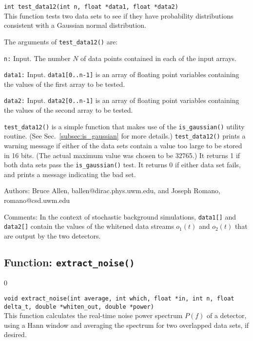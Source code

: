 {\tt int test\_data12(int n, float *data1, float *data2)}\\
%
This function tests two data sets to see if they have probability
distributions consistent with a Gaussian normal distribution.

The arguments of {\tt test\_data12()} are:
\begin{description}
%
\item{\tt n:} Input. 
The number $N$ of data points contained in each of the input arrays.
%
\item{\tt data1:} Input.
{\tt data1[0..n-1]} is an array of floating point variables containing
the values of the first array to be tested.
%
\item{\tt data2:} Input.
{\tt data2[0..n-1]} is an array of floating point variables containing
the values of the second array to be tested.
%
\end{description}

{\tt test\_data12()} is a simple function that makes use of the
{\tt is\_gaussian()} utility routine.
(See Sec.~\ref{subsec:is_gaussian} for more details.)
{\tt test\_data12()} prints a warning message if either of the data
sets contain a value too large to be stored in 16 bits.
(The actual maximum value was chosen to be 32765.)
It returns 1 if both data sets pass the {\tt is\_gaussian()} test.
It returns 0 if either data set fails, and prints a message indicating
the bad set.
%
\begin{description}
\item{Authors:}
Bruce Allen, ballen@dirac.phys.uwm.edu, and Joseph Romano, romano@csd.uwm.edu
\item{Comments:} 
In the context of stochastic background simulations, {\tt data1[]}
and {\tt data2[]} contain the values of the whitened data streams 
$o_1(t)$ and $o_2(t)$ that are output by the two detectors.
\end{description}
\clearpage

\subsection{Function: {\tt extract\_noise()}}
\label{subsec:extract_noise}
\setcounter{equation}0

{\tt void extract\_noise(int average, int which, float *in, int n, 
float delta\_t, double *whiten\_out, double *power)}\\
%
This function calculates the real-time noise power 
spectrum $P(f)$ of a detector, using a Hann window and averaging the 
spectrum for two overlapped data sets, if desired.


